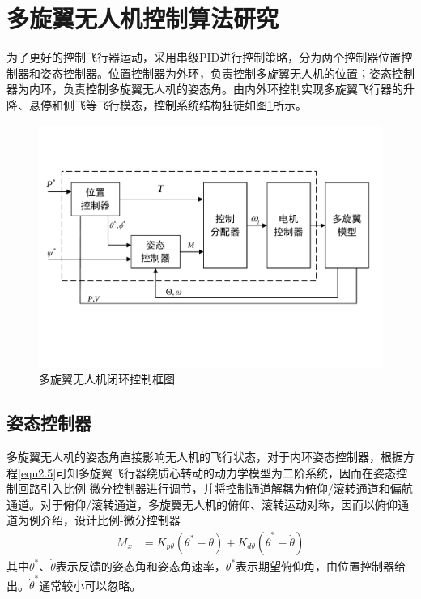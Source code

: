 \section{多旋翼无人机控制算法研究}
为了更好的控制飞行器运动，采用串级PID进行控制策略，分为两个控制器位置控制器和姿态控制器\upcite{[2.5]}。位置控制器为外环，负责控制多旋翼无人机的位置；姿态控制器为内环，负责控制多旋翼无人机的姿态角。由内外环控制实现多旋翼飞行器的升降、悬停和侧飞等飞行模态，控制系统结构狂徒如图\ref{fig2.3}所示。
\begin{figure}[h]
\centering
\includegraphics[scale=0.5,angle=-90]{figures/Fig2-3.pdf}
\caption{多旋翼无人机闭环控制框图}
\label{fig2.3}
\end{figure}

\subsection{姿态控制器}
多旋翼无人机的姿态角直接影响无人机的飞行状态，对于内环姿态控制器，根据方程\eqref{equ2.5}可知多旋翼飞行器绕质心转动的动力学模型为二阶系统，因而在姿态控制回路引入比例-微分控制器进行调节，并将控制通道解耦为俯仰/滚转通道和偏航通道。对于俯仰/滚转通道，多旋翼无人机的俯仰、滚转运动对称，因而以俯仰通道为例介绍，设计比例-微分控制器
\begin{equation}
\label{equ2.12}
\begin{aligned}
M_x &= K_{p\theta} \left( \theta^* - \theta \right) + K_{d\theta} \left( \dot{\theta}^* -  \dot{\theta} \right)
\end{aligned}
\end{equation}
其中$\theta^*$、$\dot{\theta}$表示反馈的姿态角和姿态角速率，$\theta^*$表示期望俯仰角，由位置控制器给出。$ \dot{\theta}^*$通常较小可以忽略。

